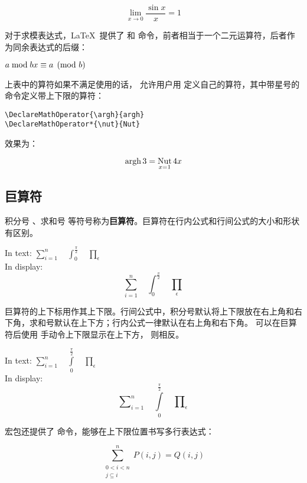 \begin{example}
\[
  \lim_{x \rightarrow 0}
  \frac{\sin x}{x}=1
\]
\end{example}

对于求模表达式，\LaTeX\ 提供了  和  命令，前者相当于一个二元运算符，后者作为同余表达式的后缀：
\begin{example}
$a\bmod b \\
 x\equiv a \pmod{b}$
\end{example}

上表中的算符如果不满足使用的话， 允许用户用  
定义自己的算符，其中带星号的命令定义带上下限的算符：
\begin{verbatim}
\DeclareMathOperator{\argh}{argh}
\DeclareMathOperator*{\nut}{Nut}
\end{verbatim}

效果为：
\begin{example}
\[\argh 3 = \nut_{x=1} 4x\]
\end{example}

\subsection{巨算符}

积分号 、求和号  等符号称为\textbf{巨算符}。巨算符在行内公式和行间公式的大小和形状有区别。
\begin{example}
In text: 
$\sum_{i=1}^n \quad
\int_0^{\frac{\pi}{2}} \quad
\prod_\epsilon $ \\
In display:
\[\sum_{i=1}^n \quad
\int_0^{\frac{\pi}{2}} \quad
\prod_\epsilon \]
\end{example}

巨算符的上下标用作其上下限。行间公式中，积分号默认将上下限放在右上角和右下角，求和号默认在上下方；行内公式一律默认在右上角和右下角。
可以在巨算符后使用  手动令上下限显示在上下方， 则相反。
\begin{example}
In text: 
$\sum\limits_{i=1}^n \quad
\int\limits_0^{\frac{\pi}{2}} \quad
\prod\limits_\epsilon $ \\
In display:
\[\sum\nolimits_{i=1}^n \quad
\int\limits_0^{\frac{\pi}{2}} \quad
\prod\nolimits_\epsilon \]
\end{example}

 宏包还提供了  命令，能够在上下限位置书写多行表达式：
\begin{example}
\[
\sum^n_{\substack{0<i<n \\
j\subseteq i}}
P(i,j) = Q(i,j)
\]
\end{example}

